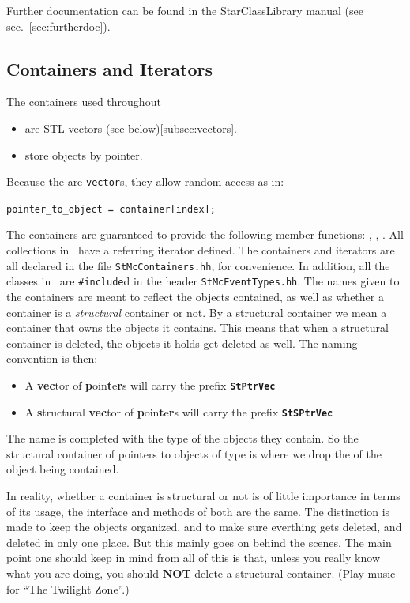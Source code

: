 Further documentation can be found in the StarClassLibrary manual
(see sec.~\ref{sec:furtherdoc}).

\subsection{Containers and Iterators}
\label{sec:containers}

The containers used throughout \StMcEvent\
\begin{itemize}
  \item are STL vectors (see below)\ref{subsec:vectors}.
  \item store objects by pointer.
\end{itemize}
Because the are {\tt vector}s, they allow random access as in:

\verb+pointer_to_object = container[index];+

The containers are guaranteed to provide the following member functions:
\name{size()}, \name{begin()}, \name{end()}.  All collections in
\StMcEvent\ have a referring iterator defined.
The containers and iterators are all declared in the file
{\tt StMcContainers.hh}, for convenience.  In addition,
all the classes in \StMcEvent\ are {\tt \#include}d in
the header {\tt StMcEventTypes.hh}.
The names given to the containers are meant to reflect
the objects contained, as well as whether a container is
a {\it structural} container or not.
By a structural container we mean a container that owns the objects
it contains.  This means that when a structural container is deleted,
the objects it holds get deleted as well.  The naming convention
is then:

\begin{itemize}
  \item A {\bf vec}tor of {\bf p}oin{\bf t}e{\bf r}s
will carry the prefix {\bf \tt StPtrVec}
  \item A {\bf s}tructural {\bf vec}tor of {\bf p}oin{\bf t}e{\bf r}s
will carry the prefix {\bf \tt StSPtrVec}
\end{itemize}

The name is completed with the type of the objects they contain.  So
the structural container of pointers to objects of type  is
\name{StSPtrVecMcTpcHit} where we drop the \name{St} of the object being
contained.

In reality, whether a container is structural or not
is of little importance in terms of its usage, the interface and methods of
both are the same.  The distinction is made to keep the objects organized,
and to make sure everthing gets deleted, and deleted in only one place.  But
this mainly goes on behind the scenes.  The main point one should
keep in mind from all of this is that, unless you really know
what you are doing, you should {\bf NOT} delete a
structural container.  (Play music for ``The Twilight Zone''.)


